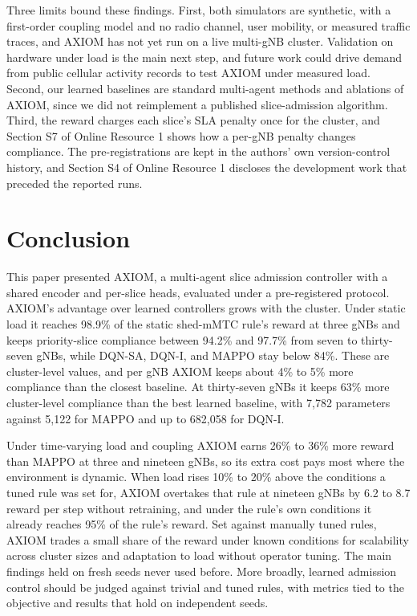 \documentclass[pdflatex,sn-basic,Numbered]{sn-jnl}
\begin{document}
Three limits bound these findings. First, both simulators are synthetic, with a first-order coupling model and no radio channel, user mobility, or measured traffic traces, and AXIOM has not yet run on a live multi-gNB cluster. Validation on hardware under load is the main next step, and future work could drive demand from public cellular activity records to test AXIOM under measured load. Second, our learned baselines are standard multi-agent methods and ablations of AXIOM, since we did not reimplement a published slice-admission algorithm. Third, the reward charges each slice's SLA penalty once for the cluster, and Section S7 of Online Resource 1 shows how a per-gNB penalty changes compliance. The pre-registrations are kept in the authors' own version-control history, and Section S4 of Online Resource 1 discloses the development work that preceded the reported runs.

\section{Conclusion}
This paper presented AXIOM, a multi-agent slice admission controller with a shared encoder and per-slice heads, evaluated under a pre-registered protocol. AXIOM's advantage over learned controllers grows with the cluster. Under static load it reaches 98.9\% of the static shed-mMTC rule's reward at three gNBs and keeps priority-slice compliance between 94.2\% and 97.7\% from seven to thirty-seven gNBs, while DQN-SA, DQN-I, and MAPPO stay below 84\%. These are cluster-level values, and per gNB AXIOM keeps about 4\% to 5\% more compliance than the closest baseline. At thirty-seven gNBs it keeps 63\% more cluster-level compliance than the best learned baseline, with 7,782 parameters against 5,122 for MAPPO and up to 682,058 for DQN-I.

Under time-varying load and coupling AXIOM earns 26\% to 36\% more reward than MAPPO at three and nineteen gNBs, so its extra cost pays most where the environment is dynamic. When load rises 10\% to 20\% above the conditions a tuned rule was set for, AXIOM overtakes that rule at nineteen gNBs by 6.2 to 8.7 reward per step without retraining, and under the rule's own conditions it already reaches 95\% of the rule's reward. Set against manually tuned rules, AXIOM trades a small share of the reward under known conditions for scalability across cluster sizes and adaptation to load without operator tuning. The main findings held on fresh seeds never used before. More broadly, learned admission control should be judged against trivial and tuned rules, with metrics tied to the objective and results that hold on independent seeds.
\end{document}
